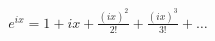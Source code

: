 \documentclass[preview]{standalone}
\begin{document}
\begin{align*}
e^{ix} = 1 + ix + \frac{(ix)^2}{2!} + \frac{(ix)^3}{3!} + \dots
\end{align*}
\end{document}
